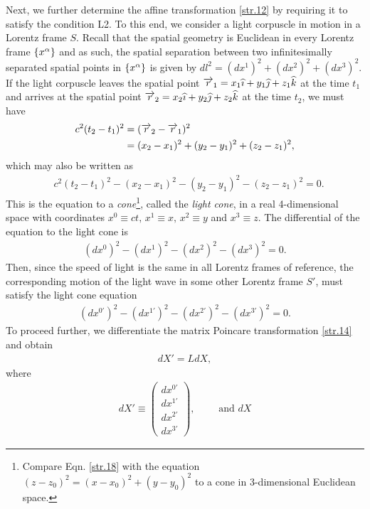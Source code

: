 \begin{small}
Next, we further determine the affine transformation 
\eqref{str.12} by requiring it to satisfy the condition L2. 
To this end, we consider a light corpuscle in motion in a 
Lorentz frame $S$. Recall that the spatial geometry is 
Euclidean in every Lorentz frame $\{x^\gka \}$ and as such, 
the spatial separation between two infinitesimally 
separated 
spatial points in $\{x^\gka \}$ is given by $dl^2 = 
(dx^1)^2 
+ (dx^2)^2 + (dx^3)^2 $. If the light corpuscle leaves the 
spatial point $\vec{r}_1=x_1\eye +y_1\jay +z_1\kay$ at the 
time $t_1 $ and arrives at the spatial point  $\vec{r}_2 = 
x_2 \eye +y_2 \jay +z_2\kay$ at the time $t_2$, we must have
\begin{align*}
c^2(t_2-t_1)^2&=(\vec{r}_2-\vec{r}_1)^2\notag\\
&=(x_2-x_1)^2 + (y_2-y_1)^2 + (z_2-z_1)^2,
\end{align*}
which may also be written as
\begin{align}\label{str.18}
&c^2(t_2-t_1)^2-(x_2-x_1)^2- (y_2-y_1)^2
-(z_2-z_1)^2=0.
\end{align}
This is the equation to a \textsl{cone}\footnote{Compare 
Eqn. 
\eqref{str.18} with the equation  $(z-z_0)^2 = (x-x_0)^2 + 
(y-y_0)^2$ to a cone in 3-dimensional Euclidean space.}, 
called the \textsl{light cone}, in a real 4-dimen\break sional 
space with coordinates $x^0 \equiv ct, \,x^1 \equiv x, \, 
x^2 \equiv y $ and $x^3 \equiv z$. The differential of the 
equation to the {light cone} is
\begin{align}\label{str.19}
(dx^0)^2-(dx^1)^2-(dx^2)^2-(dx^3)^2=0.
\end{align}
Then, since the speed of light is the same in all Lorentz 
frames of reference, the corresponding motion of the light 
wave in some other Lorentz frame $S'$, must satisfy the 
light cone equation
\begin{align}\label{str.20}
(dx^{0'})^2-(dx^{1'})^2-(dx^{2'})^2-(dx^{3'})^2=0.
\end{align}
To proceed further, we differentiate the matrix Poincare  
transformation \eqref{str.14} and obtain
\begin{align}\label{str.21}
dX' =LdX,
\end{align}
where
\begin{align}\label{str.22}
dX' \equiv
\begin{pmatrix} dx^{0'}\\ dx^{1'}\\dx^{2'}\\dx^{3'}
\end{pmatrix} ,\qquad \text{ and }dX

\end{align}
\end{small}
